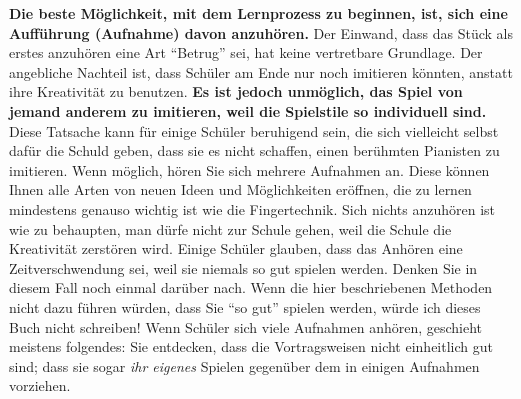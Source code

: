 \textbf{Die beste Möglichkeit, mit dem Lernprozess zu beginnen, ist, sich eine Aufführung (Aufnahme) davon anzuhören.}
Der Einwand, dass das Stück als erstes anzuhören eine Art \enquote{Betrug} sei, hat keine vertretbare Grundlage.
Der angebliche Nachteil ist, dass Schüler am Ende nur noch imitieren könnten, anstatt ihre Kreativität zu benutzen.
\textbf{Es ist jedoch unmöglich, das Spiel von jemand anderem zu imitieren, weil die Spielstile so individuell sind.}
Diese Tatsache kann für einige Schüler beruhigend sein, die sich vielleicht selbst dafür die Schuld geben, dass sie es nicht schaffen, einen berühmten Pianisten zu imitieren.
Wenn möglich, hören Sie sich mehrere Aufnahmen an.
Diese können Ihnen alle Arten von neuen Ideen und Möglichkeiten eröffnen, die zu lernen mindestens genauso wichtig ist wie die Fingertechnik.
Sich nichts anzuhören ist wie zu behaupten, man dürfe nicht zur Schule gehen, weil die Schule die Kreativität zerstören wird.
Einige Schüler glauben, dass das Anhören eine Zeitverschwendung sei, weil sie niemals so gut spielen werden.
Denken Sie in diesem Fall noch einmal darüber nach.
Wenn die hier beschriebenen Methoden nicht dazu führen würden, dass Sie \enquote{so gut} spielen werden, würde ich dieses Buch nicht schreiben!
Wenn Schüler sich viele Aufnahmen anhören, geschieht meistens folgendes: Sie entdecken, dass die Vortragsweisen nicht einheitlich gut sind; dass sie sogar \textit{ihr eigenes} Spielen gegenüber dem in einigen Aufnahmen vorziehen.

